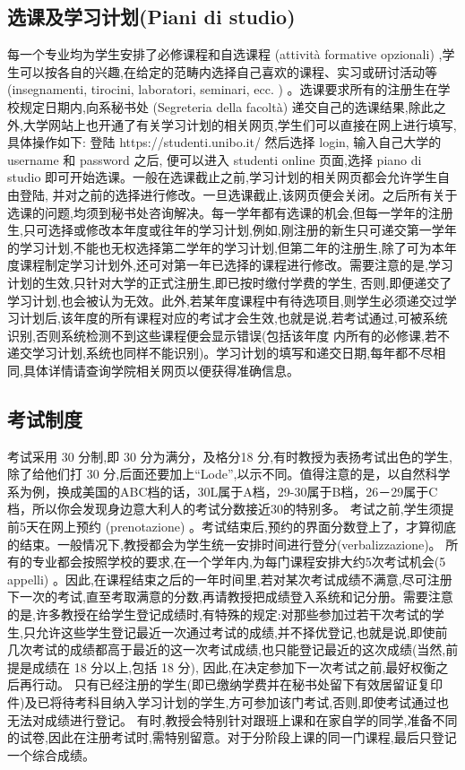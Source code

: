 \documentclass[3pt,a5paper,openright,twoside]{book}
\begin{document}
\subsection{选课及学习计划(Piani di studio)}
每一个专业均为学生安排了必修课程和自选课程 (attività formative opzionali) ,学生可以按各自的兴趣,在给定的范畴内选择自己喜欢的课程、实习或研讨活动等(insegnamenti, tirocini, laboratori, seminari, ecc. ) 。选课要求所有的注册生在学校规定日期内,向系秘书处 (Segreteria della facoltà) 递交自己的选课结果,除此之外,大学网站上也开通了有关学习计划的相关网页,学生们可以直接在网上进行填写,具体操作如下: 登陆 https://studenti.unibo.it/ 然后选择 login, 输入自己大学的 username 和 password 之后, 便可以进入 studenti online 页面,选择 piano di studio 即可开始选课。一般在选课截止之前,学习计划的相关网页都会允许学生自由登陆, 并对之前的选择进行修改。一旦选课截止,该网页便会关闭。之后所有关于选课的问题,均须到秘书处咨询解决。每一学年都有选课的机会,但每一学年的注册生,只可选择或修改本年度或往年的学习计划,例如,刚注册的新生只可递交第一学年的学习计划,不能也无权选择第二学年的学习计划,但第二年的注册生,除了可为本年度课程制定学习计划外,还可对第一年已选择的课程进行修改。需要注意的是,学习计划的生效,只针对大学的正式注册生,即已按时缴付学费的学生, 否则,即便递交了学习计划,也会被认为无效。此外,若某年度课程中有待选项目,则学生必须递交过学习计划后,该年度的所有课程对应的考试才会生效,也就是说,若考试通过,可被系统识别,否则系统检测不到这些课程便会显示错误(包括该年度 内所有的必修课,若不递交学习计划,系统也同样不能识别)。学习计划的填写和递交日期,每年都不尽相同,具体详情请查询学院相关网页以便获得准确信息。 

\subsection{考试制度}
考试采用 30 分制,即 30 分为满分，及格分18 分,有时教授为表扬考试出色的学生,除了给他们打 30 分,后面还要加上“Lode”,以示不同。值得注意的是，以自然科学系为例，换成美国的ABC档的话，30L属于A档，29-30属于B档，26－29属于C档，所以你会发现身边意大利人的考试分数接近30的特别多。
考试之前,学生须提前5天在网上预约 (prenotazione) 。考试结束后,预约的界面分数登上了，才算彻底的结束。一般情况下,教授都会为学生统一安排时间进行登分(verbalizzazione)。
所有的专业都会按照学校的要求,在一个学年内,为每门课程安排大约5次考试机会(5 appelli) 。因此,在课程结束之后的一年时间里,若对某次考试成绩不满意,尽可注册下一次的考试,直至考取满意的分数,再请教授把成绩登入系统和记分册。需要注意的是,许多教授在给学生登记成绩时,有特殊的规定:对那些参加过若干次考试的学生,只允许这些学生登记最近一次通过考试的成绩,并不择优登记,也就是说,即使前几次考试的成绩都高于最近的这一次考试成绩,也只能登记最近的这次成绩(当然,前提是成绩在 18 分以上,包括 18 分), 因此,在决定参加下一次考试之前,最好权衡之后再行动。 只有已经注册的学生(即已缴纳学费并在秘书处留下有效居留证复印件)及已将待考科目纳入学习计划的学生,方可参加该门考试,否则,即使考试通过也无法对成绩进行登记。 
有时,教授会特别针对跟班上课和在家自学的同学,准备不同的试卷,因此在注册考试时,需特别留意。对于分阶段上课的同一门课程,最后只登记一个综合成绩。
\end{document}
